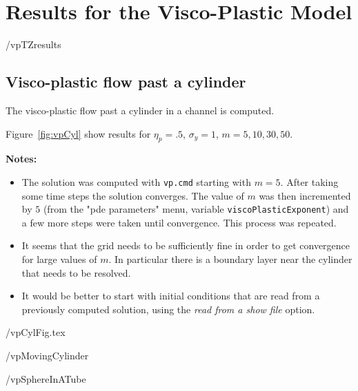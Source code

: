 \section{Results for the Visco-Plastic Model}

\newcommand{\cDt}{{\rm cDt}}

 \vpDir/vpTZresults

\clearpage
\subsection{Visco-plastic flow past a cylinder}\label{sec:vpCyl}

The visco-plastic flow past a cylinder in a channel is computed. 

Figure~\ref{fig:vpCyl} show results for $\eta_p=.5$, $\sigma_y=1$, $m=5,10,30,50$.


{\bf Notes:} 
\begin{itemize}
\item The solution was computed with {\tt vp.cmd} starting with $m=5$. After taking 
some time steps the solution converges. The value of $m$ was then incremented by $5$ (from the "pde parameters" menu,
variable {\tt viscoPlasticExponent}) and a few more steps were taken until convergence. This process was repeated.

\item It seems that the grid needs to be sufficiently fine in order to get convergence for large values of $m$. In particular there
      is a boundary layer near the cylinder that needs to be resolved. 

\item It would be better to start with initial conditions that are read from a previously computed solution, using
      the {\em read from a show file} option.

\end{itemize}

 \vpDir/vpCylFig.tex




 \vpDir/vpMovingCylinder


 \vpDir/vpSphereInATube
